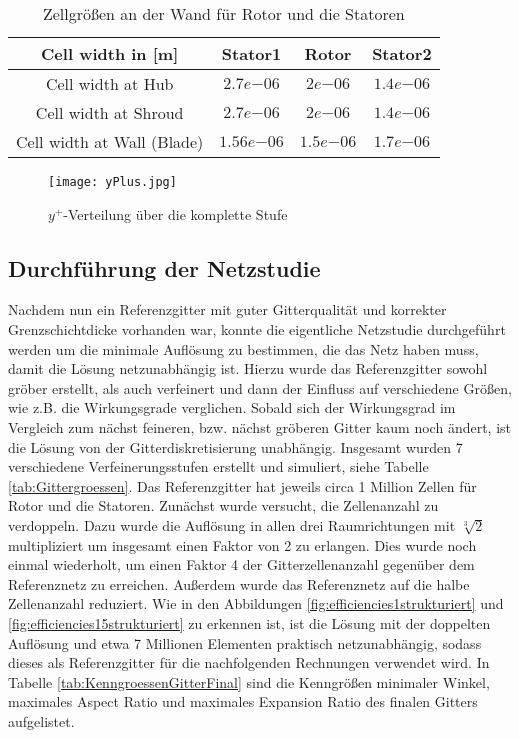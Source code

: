 \begin{table}[H]
\centering
\begin{tabular}[t]{cccc}
\toprule
 Cell width in [m] & Stator1 & Rotor & Stator2  \\
\midrule
Cell width at Hub & $2.7e{-06}$ & $2e{-06}$ & $1.4e{-06}$\\
Cell width at Shroud & $2.7e{-06}$ & $2e{-06}$ & $1.4e{-06}$ \\
Cell width at Wall (Blade) & $1.56e{-06}$ & $1.5e{-06}$ & $1.7e{-06}$ \\
\bottomrule
\end{tabular}
\caption{Zellgrößen an der Wand für Rotor und die Statoren} \label{cellWidths}
\end{table}

\begin{figure}[H]
	\centering
    
	\texttt{[image: yPlus.jpg]}
	\caption{$y^+$-Verteilung über die komplette Stufe} \label{imgYplusWerte}
\end{figure}

\subsection{Durchführung der Netzstudie}

Nachdem nun ein Referenzgitter mit guter Gitterqualität und korrekter Grenzschichtdicke vorhanden war, konnte die eigentliche Netzstudie durchgeführt werden um die minimale Auflösung zu bestimmen, die das Netz haben muss, damit die Lösung netzunabhängig ist. Hierzu wurde das Referenzgitter sowohl gröber erstellt, als auch verfeinert und dann der Einfluss auf verschiedene Größen, wie z.B. die Wirkungsgrade verglichen. Sobald sich der Wirkungsgrad im Vergleich zum nächst feineren, bzw. nächst gröberen Gitter kaum noch ändert, ist die Lösung von der Gitterdiskretisierung unabhängig. 
Insgesamt wurden 7 verschiedene Verfeinerungsstufen erstellt und simuliert, siehe Tabelle \ref{tab:Gittergroessen}. Das Referenzgitter hat jeweils circa 1 Million Zellen für Rotor und die Statoren. Zunächst wurde versucht, die Zellenanzahl zu verdoppeln. Dazu wurde die Auflösung in allen drei Raumrichtungen mit $\sqrt[3]{2}$ multipliziert um insgesamt einen Faktor von 2 zu erlangen. Dies wurde noch einmal wiederholt, um einen Faktor 4 der Gitterzellenanzahl gegenüber dem Referenznetz zu erreichen. Außerdem wurde das Referenznetz auf die halbe Zellenanzahl reduziert. Wie in den Abbildungen \ref{fig:efficiencies1strukturiert} und  \ref{fig:efficiencies15strukturiert} zu erkennen ist, ist die Lösung mit der doppelten Auflösung und etwa 7 Millionen Elementen praktisch netzunabhängig, sodass dieses als Referenzgitter für die nachfolgenden Rechnungen verwendet wird. 
In Tabelle \ref{tab:KenngroessenGitterFinal}  sind die Kenngrößen minimaler Winkel, maximales Aspect Ratio und maximales Expansion Ratio des finalen Gitters aufgelistet.

